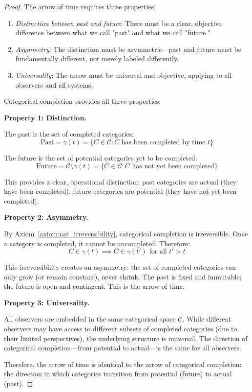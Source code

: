 \documentclass[12pt,a4paper]{article}
\theoremstyle{definition}
\theoremstyle{remark}
\begin{document}
\begin{proof}
The arrow of time requires three properties:
\begin{enumerate}
    \item \emph{Distinction between past and future}: There must be a clear, objective difference between what we call "past" and what we call "future."
    \item \emph{Asymmetry}: The distinction must be asymmetric—past and future must be fundamentally different, not merely labeled differently.
    \item \emph{Universality}: The arrow must be universal and objective, applying to all observers and all systems.
\end{enumerate}

Categorical completion provides all three properties:

\textbf{Property 1: Distinction.}

The past is the set of completed categories:
\begin{equation}
\text{Past} = \gamma(t) = \{C \in \mathcal{C} : C \text{ has been completed by time } t\}
\end{equation}

The future is the set of potential categories yet to be completed:
\begin{equation}
\text{Future} = \mathcal{C} \setminus \gamma(t) = \{C \in \mathcal{C} : C \text{ has not yet been completed}\}
\end{equation}

This provides a clear, operational distinction: past categories are actual (they have been completed), future categories are potential (they have not yet been completed).

\textbf{Property 2: Asymmetry.}

By Axiom~\ref{axiom:cat_irreversibility}, categorical completion is irreversible. Once a category is completed, it cannot be uncompleted. Therefore:
\begin{equation}
C \in \gamma(t) \implies C \in \gamma(t') \text{ for all } t' > t
\end{equation}

This irreversibility creates an asymmetry: the set of completed categories can only grow (or remain constant), never shrink. The past is fixed and immutable; the future is open and contingent. This is the arrow of time.

\textbf{Property 3: Universality.}

All observers are embedded in the same categorical space $\mathcal{C}$. While different observers may have access to different subsets of completed categories (due to their limited perspectives), the underlying structure is universal. The direction of categorical completion—from potential to actual—is the same for all observers.

Therefore, the arrow of time is identical to the arrow of categorical completion: the direction in which categories transition from potential (future) to actual (past).
\end{proof}
\end{document}
